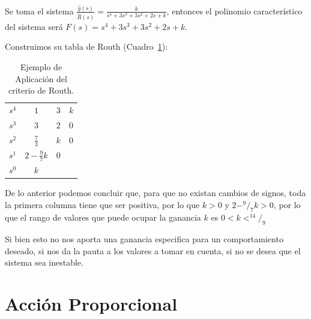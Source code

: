             Se toma el sistema $\frac{\hat{y}(s)}{\hat{R}(s)} = \frac{k}{s^4 + 3 s^3 + 3 s^2 + 2 s + k}$, entonces el polinomio característico del sistema será $F(s) = s^4 + 3 s^3 + 3 s^2 + 2 s + k$.

            Construimos su tabla de Routh (Cuadro~\ref{tab:EjemploAplicacion}):

            \begin{table}[htbp]
                \centering
                \begin{tabular}{c|c c c}
                $s^4$ & $1$ & $3$ & $k$ \\
                $s^3$ & $3$ & $2$ & $0$ \\
                $s^2$ & $\frac{7}{3}$ & $k$ & $0$ \\
                $s^1$ & $2 - \frac{9}{7} k$ & $0$ \\
                $s^0$ & $k$
                \end{tabular}
                \caption{\label{tab:EjemploAplicacion}Ejemplo de Aplicación del criterio de Routh.}
            \end{table}

            De lo anterior podemos concluir que, para que no existan cambios de signos, toda la primera columna tiene que ser positiva, por lo que $k > 0$ y  $2 - ^9/_7 k > 0$, por lo que el rango de valores que puede ocupar la ganancia $k$ es $0 < k < ^{14}/_9$

            Si bien esto no nos aporta una ganancia especifica para un comportamiento deseado, si nos da la pauta a los valores a tomar en cuenta, si no se desea que el sistema sea inestable.

    \newpage
    \section{Acción Proporcional}

